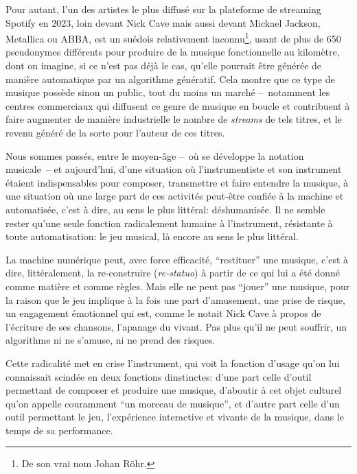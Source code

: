 Pour autant, l'un des artistes le plus diffusé sur la plateforme de streaming Spotify en 2023, loin devant Nick Cave mais aussi devant Mickael Jackson, Metallica ou ABBA, est un suédois relativement inconnu\footnote{De son vrai nom Johan Röhr.}, usant de plus de 650 pseudonymes différents pour produire de la musique fonctionnelle au kilomètre, dont on imagine, si ce n'est pas déjà le cas, qu'elle pourrait être générée de manière automatique par un algorithme génératif. Cela montre que ce type de musique possède sinon un public, tout du moins un marché --~notamment les centres commerciaux qui diffusent ce genre de musique en boucle et contribuent à faire augmenter de manière industrielle le nombre de \textit{streams} de tels titres, et le revenu généré de la sorte pour l'auteur de ces titres.


Nous sommes passés, entre le moyen-âge --~où se développe la notation musicale~-- et aujourd'hui, d'une situation où l'instrumentiste et son instrument étaient indispensables pour composer, transmettre et faire entendre la musique, à une situation où une large part de ces activités peut-être confiée à la machine et automatisée, c'est à dire, au sens le plus littéral: déshumanisée.
Il ne semble rester qu'une seule fonction radicalement humaine à l'instrument, résistante à toute automatisation: le jeu musical, là encore au sens le plus littéral.


La machine numérique peut, avec force efficacité, ``restituer'' une musique, c'est à dire, littéralement, la re-construire (\textit{re-statuo}) à partir de ce qui lui a été donné comme matière et comme règles.
Mais elle ne peut pas ``jouer'' une musique, pour la raison que le jeu implique à la fois une part d'amusement, une prise de risque, un engagement émotionnel qui est, comme le notait Nick Cave à propos de l'écriture de ses chansons, l'apanage du vivant. Pas plus qu'il ne peut souffrir, un algorithme ni ne s'amuse, ni ne prend des risques.

Cette radicalité met en crise l'instrument, qui voit la fonction d'usage qu'on lui connaissait scindée en deux fonctions dinstinctes: d'une part celle d'outil permettant de composer et produire une musique, d'aboutir à cet objet culturel qu'on appelle couramment ``un morceau de musique'', et d'autre part celle d'un outil permettant le jeu, l'expérience interactive et vivante de la musique, dans le temps de sa performance.

